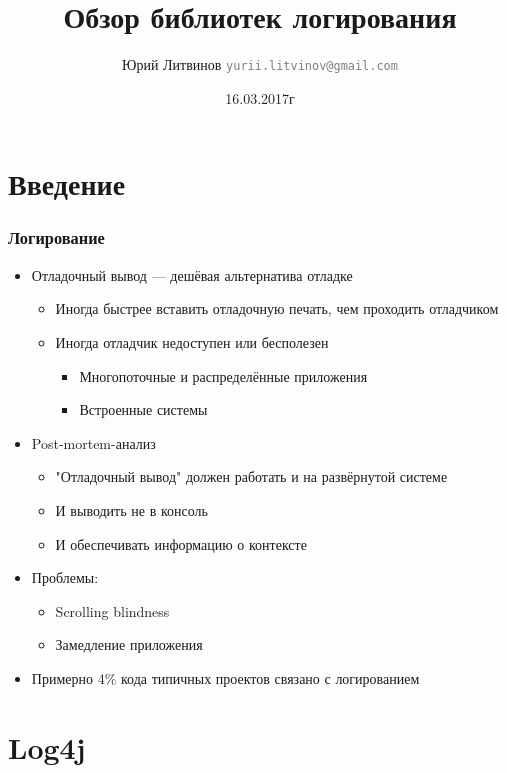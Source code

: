 \documentclass[xetex,mathserif,serif]{beamer}
\title{Обзор библиотек логирования}
\author[Юрий Литвинов]{Юрий Литвинов \newline \textcolor{gray}{\small\texttt{yurii.litvinov@gmail.com}}}
\date{16.03.2017г}
\begin{document}
	
	\frame{\titlepage}
	
	\section{Введение}

	\begin{frame}
		\frametitle{Логирование}
		\begin{itemize}
			\item Отладочный вывод --- дешёвая альтернатива отладке
			\begin{itemize}
				\item Иногда быстрее вставить отладочную печать, чем проходить отладчиком
				\item Иногда отладчик недоступен или бесполезен
				\begin{itemize}
					\item Многопоточные и распределённые приложения
					\item Встроенные системы
				\end{itemize}
			\end{itemize}
			\item Post-mortem-анализ
			\begin{itemize}
				\item "Отладочный вывод" должен работать и на развёрнутой системе
				\item И выводить не в консоль
				\item И обеспечивать информацию о контексте
			\end{itemize}
			\item Проблемы:
			\begin{itemize}
				\item Scrolling blindness
				\item Замедление приложения
			\end{itemize}
			\item Примерно 4\% кода типичных проектов связано с логированием
		\end{itemize}
	\end{frame}

	\section{Log4j}
\end{document}

